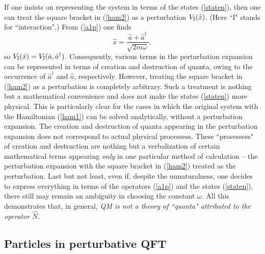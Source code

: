 \documentclass[12pt]{article}
\begin{document}
If one insists on representing the system in terms of the states 
(\ref{staten}), then one can treat the square bracket in (\ref{ham2}) 
as a perturbation $V_{\rm I}(\hat{x})$. (Here ``I" stands for
``interaction".) 
From (\ref{a1p}) one finds 
\begin{equation}\label{e81}
\hat{x}=\frac{\hat{a}+\hat{a}^{\dagger}}{\sqrt{2m\omega}} ,
\end{equation}
so $V_{\rm I}(\hat{x})=V_{\rm I}(\hat{a},\hat{a}^{\dagger})$.
Consequently,
various terms in the perturbation expansion can be represented 
in terms of creation and destruction of quanta, owing to
the occurrence of $\hat{a}^{\dagger}$ and $\hat{a}$, respectively.
However, treating the square bracket in (\ref{ham2}) as a 
perturbation is completely arbitrary. Such a treatment 
is nothing but a mathematical convenience and does not make 
the states (\ref{staten}) more physical. This is particularly 
clear for the cases in which the original system with the 
Hamiltonian (\ref{ham1}) can be solved analytically, without 
a perturbation expansion. The creation and destruction of 
quanta appearing in the perturbation expansion does not
correspond to actual physical processess. 
These ``processess" of creation and destruction are nothing 
but a verbalization of certain mathematical terms appearing {\em only} 
in one particular method of calculation -- the perturbation expansion 
with the square bracket in (\ref{ham2}) treated as 
the perturbation. Last but not least, even if, despite the unnaturalness, 
one decides to express everything in terms of the operators
(\ref{a1p}) and the states (\ref{staten}), there still may remain an 
ambiguity in choosing the constant $\omega$.   
All this demonstrates that, in general, {\em QM
is not a theory of ``quanta" attributed to the operator $\hat{N}$.}

\subsection{Particles in perturbative QFT}
\end{document}
